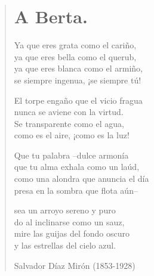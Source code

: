 \documentclass[12pt, twoside]{book}
\begin{document}
\newpage
\begin{verse}
\begin{center}
\section{A Berta.}
\end{center}
Ya que eres grata como el cariño,\\
ya que eres bella como el querub,\\
ya que eres blanca como el armiño,\\
se siempre ingenua, ¡se siempre tú!
\newline

El torpe engaño que el vicio fragua\\
nunca se aviene con la virtud.\\
Se transparente como el agua,\\
como es el aire, ¡como es la luz!
\newline

Que tu palabra --dulce armonía\\
que tu alma exhala como un laúd,\\
como una alondra que anuncia el día\\
presa en la sombra que flota aún--
\newline

sea un arroyo sereno y puro\\
do al inclinarse como un sauz,\\
mire las guijas del fondo oscuro\\
y las estrellas del cielo azul.
\newline

Salvador Díaz Mirón (1853-1928)
\end{verse}
\end{document}
